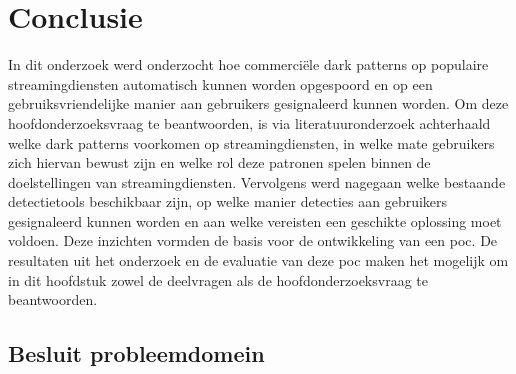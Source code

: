 
\chapter{Conclusie}%
\label{ch:conclusie}


\vspace{1em}

In dit onderzoek werd onderzocht hoe commerciële dark patterns op populaire streamingdiensten automatisch kunnen worden opgespoord en op een gebruiksvriendelijke manier aan gebruikers gesignaleerd kunnen worden. Om deze hoofdonderzoeksvraag te beantwoorden, is via literatuuronderzoek achterhaald welke dark patterns voorkomen op streamingdiensten, in welke mate gebruikers zich hiervan bewust zijn en welke rol deze patronen spelen binnen de doelstellingen van streamingdiensten. Vervolgens werd nagegaan welke bestaande detectietools beschikbaar zijn, op welke manier detecties aan gebruikers gesignaleerd kunnen worden en aan welke vereisten een geschikte oplossing moet voldoen. Deze inzichten vormden de basis voor de ontwikkeling van een \acrlong{poc}. De resultaten uit het onderzoek en de evaluatie van deze \acrlong{poc} maken het mogelijk om in dit hoofdstuk zowel de deelvragen als de hoofdonderzoeksvraag te beantwoorden.

\vspace{1em}

\section{Besluit probleemdomein}
\label{sec:besluit-probleemdomein}

\vspace{1em}


